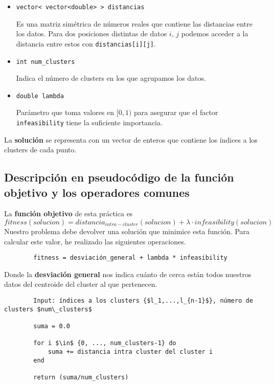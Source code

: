 \begin{itemize}
			\item \lstinline!vector< vector<double> > distancias!
			
				Es una matriz simétrica de números reales que contiene las distancias entre los datos. Para dos posiciones distintas de datos $i$, $j$ podemos acceder a la distancia entre estos con \lstinline!distancias[i][j]!.
			
			\item \lstinline!int num_clusters!
			
				Indica el número de clusters en los que agrupamos los datos.
			\item \lstinline!double lambda!

				Parámetro que toma valores en [$0,1)$ para asegurar que el factor \lstinline!infeasibility! tiene la suficiente importancia.
		\end{itemize}

		La \textbf{solución} se representa con un vector de enteros que contiene los índices a los clusters de cada punto.

	\subsection{Descripción en pseudocódigo de la función objetivo y los operadores comunes}

		La \textbf{función objetivo} de esta práctica es 
		$$fitness (solucion) = distancia_{intra-cluster} (solucion) + \lambda \cdot infeasibility (solucion)$$
		Nuestro problema debe devolver una solución que minimice esta función.
		Para calcular este valor, he realizado las siguientes operaciones.

		\begin{lstlisting}
		fitness = desviación_general + lambda * infeasibility
		\end{lstlisting}

		Donde la \textbf{desviación general} nos indica cuánto de cerca están todos nuestros datos del centroide del cluster al que pertenecen.

		\begin{lstlisting}
		Input: índices a los clusters {$l_1,...,l_{n-1}$}, número de clusters $num\_clusters$

		suma = 0.0

		for i $\in$ {0, ..., num_clusters-1} do
			suma += distancia intra cluster del cluster i
		end

		return (suma/num_clusters)
		\end{lstlisting}

